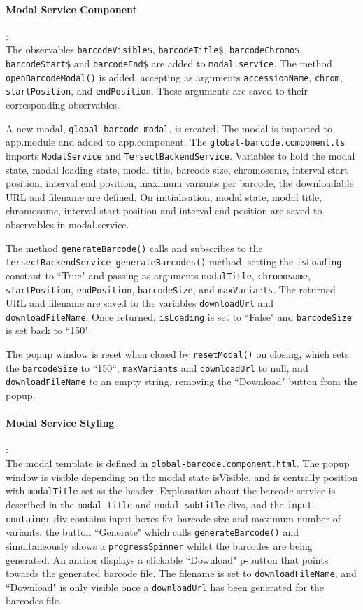 \documentclass[12pt]{article}
\begin{document}
\paragraph{Modal Service Component}:\\
The observables \verb+barcodeVisible$+, \verb+barcodeTitle$+, \verb+barcodeChromo$+, \verb+barcodeStart$+ and \verb+barcodeEnd$+ are added to \verb+modal.service+. The method \verb+openBarcodeModal()+ is added, accepting as arguments \verb+accessionName+, \verb+chrom+, \verb+startPosition+, and \verb+endPosition+. These arguments are saved to their corresponding observables.  

A new modal, \verb+global-barcode-modal+, is created. The modal is imported to app.module and added to app.component. The \verb+global-barcode.component.ts+ imports \verb+ModalService+ and \verb+TersectBackendService+. Variables to hold the modal state, modal loading state, modal title, barcode size, chromosome, interval start position, interval end position, maximum variants per barcode, the downloadable URL and filename are defined. On initialisation, modal state, modal title, chromosome, interval start position and interval end position are saved to observables in modal.service. 

The method \verb+generateBarcode()+ calls and subscribes to the \verb+tersectBackendService generateBarcodes()+ method, setting the \verb+isLoading+ constant to ``True" and passing as arguments \verb+modalTitle+, \verb+chromosome+, \verb+startPosition+, \verb+endPosition+, \verb+barcodeSize+, and \verb+maxVariants+. The returned URL and filename are saved to the variables \verb+downloadUrl+ and \verb+downloadFileName+. Once returned, \verb+isLoading+ is set to ``False" and \verb+barcodeSize+ is set back to ``150". 

The popup window is reset when closed by \verb+resetModal()+ on closing, which sets the \verb+barcodeSize+ to ``150``, \verb+maxVariants+ and \verb+downloadUrl+ to null, and \verb+downloadFileName+ to an empty string, removing the ``Download" button from the popup.  

\paragraph{Modal Service Styling}:\\
The modal template is defined in \verb+global-barcode.component.html+. The popup window is visible depending on the modal state isVisible, and is centrally position with \verb+modalTitle+ set as the header. Explanation about the barcode service is described in the \verb+modal-title+ and \verb+modal-subtitle+ divs, and the \verb+input-container+ div contains input boxes for barcode size and maximum number of variants, the button ``Generate" which calls \verb+generateBarcode()+ and simultaneously shows a \verb+progressSpinner+ whilst the barcodes are being generated. An anchor displays a clickable ``Download" p-button that points towards the generated barcode file. The filename is set to \verb+downloadFileName+, and ``Download" is only visible once a \verb+downloadUrl+ has been generated for the barcodes file.  
\end{document}
